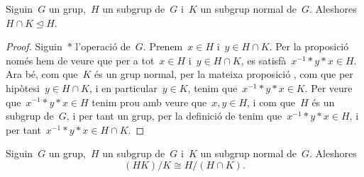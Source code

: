 \documentclass[../../main.tex]{subfiles}
\begin{document}
    \begin{lemma}
        \label{lema:Segon Teorema de l'isomorfisme entre grups}
        Siguin~\(G\) un grup,~\(H\) un subgrup de~\(G\) i~\(K\) un subgrup normal de~\(G\).
        Aleshores~\(H\cap K\trianglelefteq H\).
    \end{lemma}
    \begin{proof}
        Siguin~\(\ast\) l'operació de~\(G\).
        Prenem~\(x\in H\) i~\(y\in H\cap K\).
        Per la proposició  només hem de veure que per a tot~\(x\in H\) i~\(y\in H\cap K\), es satisfà~\(x^{-1}\ast y\ast x\in H\).
        Ara bé, com que~\(K\) és un grup normal, per la mateixa proposició , com que per hipòtesi~\(y\in H\cap K\), i en particular~\(y\in K\), tenim que~\(x^{-1}\ast y\ast x\in K\).
        Per veure que~\(x^{-1}\ast y\ast x\in H\) tenim prou amb veure que~\(x,y\in H\), i com que~\(H\) és un subgrup de~\(G\), i per tant un grup, per la definició de  tenim que~\(x^{-1}\ast y\ast x\in H\), i per tant~\(x^{-1}\ast y\ast x\in H\cap K\).
    \end{proof}
    \begin{theorem}
        \label{thm:Segon Teorema de l'isomorfisme entre grups}
        Siguin~\(G\) un grup,~\(H\) un subgrup de~\(G\) i~\(K\) un subgrup normal de~\(G\).
        Aleshores
        \[
            (HK)/K\cong H/(H\cap K).
        \]
    \end{theorem}
\end{document}
